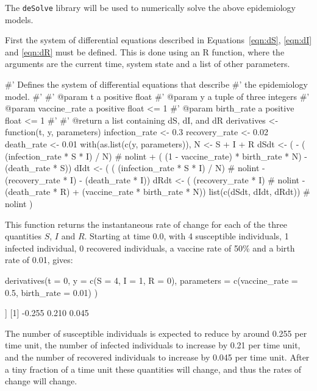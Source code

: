 The \texttt{deSolve} library will be used to numerically solve the above
epidemiology models.

First the system of differential equations described in Equations~\ref{eqn:dS},
\ref{eqn:dI} and \ref{eqn:dR} must be defined. This is done using an R function,
where the arguments are the current time, system state and a list of other
parameters.

\begin{Rin}
#' Defines the system of differential equations that describe
#' the epidemiology model.
#'
#' @param t a positive float
#' @param y a tuple of three integers
#' @param vaccine_rate a positive float <= 1
#' @param birth_rate a positive float <= 1
#'
#' @return a list containing dS, dI, and dR
derivatives <- function(t, y, parameters){
  infection_rate <- 0.3
  recovery_rate <- 0.02
  death_rate <- 0.01
  with(as.list(c(y, parameters)), {
    N <- S + I + R
    dSdt <- ( - ( (infection_rate * S * I) / N)  # nolint
             + ( (1 - vaccine_rate) * birth_rate * N)
             - (death_rate * S))
    dIdt <- ( ( (infection_rate * S * I) / N)  # nolint
            - (recovery_rate * I)
            - (death_rate * I))
    dRdt <- ( (recovery_rate * I)  # nolint
             - (death_rate * R)
             + (vaccine_rate * birth_rate * N))
    list(c(dSdt, dIdt, dRdt))  # nolint
  })
}
\end{Rin}

This function returns the instantaneous rate of change for each of the
three quantities $S$, $I$ and $R$. Starting at time 0.0, with 4 susceptible
individuals, 1 infected individual, 0 recovered individuals, a vaccine rate
of 50\% and a birth rate of 0.01, gives:

\begin{Rin}
derivatives(t = 0,
            y = c(S = 4, I = 1, R = 0),
            parameters = c(vaccine_rate = 0.5,
                           birth_rate = 0.01)
)
\end{Rin}

\begin{Rout}
[[1]]
[1] -0.255  0.210  0.045

\end{Rout}

The number of susceptible individuals is expected to reduce by around 0.255 per
time unit, the number of infected individuals to increase by 0.21 per time unit,
and the number of recovered individuals to increase by 0.045 per time unit.
After a tiny fraction of a time unit these quantities will change, and thus the
rates of change will change.

